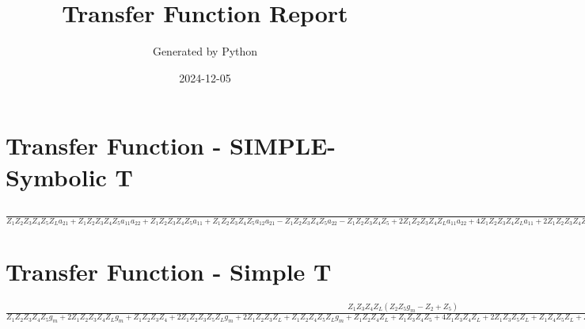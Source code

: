 \documentclass{article}
\title{Transfer Function Report}
\author{Generated by Python}
\date{2024-12-05}
\begin{document}
\maketitle

\section*{Transfer Function - SIMPLE-Symbolic T}

\(
\frac{Z_{1} Z_{3} Z_{4} Z_{L} \left(Z_{2} Z_{5} a_{11} - Z_{2} Z_{5} - Z_{2} a_{12} + Z_{5} a_{12}\right)}{Z_{1} Z_{2} Z_{3} Z_{4} Z_{5} Z_{L} a_{21} + Z_{1} Z_{2} Z_{3} Z_{4} Z_{5} a_{11} a_{22} + Z_{1} Z_{2} Z_{3} Z_{4} Z_{5} a_{11} + Z_{1} Z_{2} Z_{3} Z_{4} Z_{5} a_{12} a_{21} - Z_{1} Z_{2} Z_{3} Z_{4} Z_{5} a_{22} - Z_{1} Z_{2} Z_{3} Z_{4} Z_{5} + 2 Z_{1} Z_{2} Z_{3} Z_{4} Z_{L} a_{11} a_{22} + 4 Z_{1} Z_{2} Z_{3} Z_{4} Z_{L} a_{11} + 2 Z_{1} Z_{2} Z_{3} Z_{4} Z_{L} a_{12} a_{21} - Z_{1} Z_{2} Z_{3} Z_{4} Z_{L} a_{22} - 2 Z_{1} Z_{2} Z_{3} Z_{4} Z_{L} + Z_{1} Z_{2} Z_{3} Z_{4} a_{12} + 2 Z_{1} Z_{2} Z_{3} Z_{5} Z_{L} a_{11} a_{22} + 2 Z_{1} Z_{2} Z_{3} Z_{5} Z_{L} a_{11} + 2 Z_{1} Z_{2} Z_{3} Z_{5} Z_{L} a_{12} a_{21} - 2 Z_{1} Z_{2} Z_{3} Z_{5} Z_{L} a_{22} - 2 Z_{1} Z_{2} Z_{3} Z_{5} Z_{L} + 2 Z_{1} Z_{2} Z_{3} Z_{L} a_{12} + Z_{1} Z_{2} Z_{4} Z_{5} Z_{L} a_{11} a_{22} + Z_{1} Z_{2} Z_{4} Z_{5} Z_{L} a_{11} + Z_{1} Z_{2} Z_{4} Z_{5} Z_{L} a_{12} a_{21} - Z_{1} Z_{2} Z_{4} Z_{5} Z_{L} a_{22} - Z_{1} Z_{2} Z_{4} Z_{5} Z_{L} + Z_{1} Z_{2} Z_{4} Z_{L} a_{12} - Z_{1} Z_{3} Z_{4} Z_{5} Z_{L} a_{22} + Z_{1} Z_{3} Z_{4} Z_{5} a_{12} + 4 Z_{1} Z_{3} Z_{4} Z_{L} a_{12} + 2 Z_{1} Z_{3} Z_{5} Z_{L} a_{12} + Z_{1} Z_{4} Z_{5} Z_{L} a_{12} + Z_{2} Z_{3} Z_{4} Z_{5} Z_{L} a_{11} + Z_{2} Z_{3} Z_{4} Z_{5} a_{12} + Z_{2} Z_{3} Z_{4} Z_{L} a_{12} + 2 Z_{2} Z_{3} Z_{5} Z_{L} a_{12} + Z_{2} Z_{4} Z_{5} Z_{L} a_{12} + Z_{3} Z_{4} Z_{5} Z_{L} a_{12}}
\)

\section*{Transfer Function - Simple T}

\(
\frac{Z_{1} Z_{3} Z_{4} Z_{L} \left(Z_{2} Z_{5} g_{m} - Z_{2} + Z_{5}\right)}{Z_{1} Z_{2} Z_{3} Z_{4} Z_{5} g_{m} + 2 Z_{1} Z_{2} Z_{3} Z_{4} Z_{L} g_{m} + Z_{1} Z_{2} Z_{3} Z_{4} + 2 Z_{1} Z_{2} Z_{3} Z_{5} Z_{L} g_{m} + 2 Z_{1} Z_{2} Z_{3} Z_{L} + Z_{1} Z_{2} Z_{4} Z_{5} Z_{L} g_{m} + Z_{1} Z_{2} Z_{4} Z_{L} + Z_{1} Z_{3} Z_{4} Z_{5} + 4 Z_{1} Z_{3} Z_{4} Z_{L} + 2 Z_{1} Z_{3} Z_{5} Z_{L} + Z_{1} Z_{4} Z_{5} Z_{L} + Z_{2} Z_{3} Z_{4} Z_{5} + Z_{2} Z_{3} Z_{4} Z_{L} + 2 Z_{2} Z_{3} Z_{5} Z_{L} + Z_{2} Z_{4} Z_{5} Z_{L} + Z_{3} Z_{4} Z_{5} Z_{L}}
\)
\end{document}
